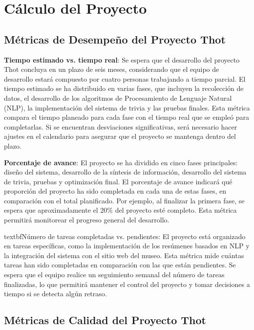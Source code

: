 \documentclass{report}
\begin{document}
    \section{Cálculo del Proyecto}
    \subsection{Métricas de Desempeño del Proyecto Thot}

    \justify
    \textbf{Tiempo estimado vs. tiempo real}: Se espera que el desarrollo del proyecto Thot concluya en un plazo de seis meses, considerando que el equipo de desarrollo estará compuesto por cuatro personas trabajando a tiempo parcial. El tiempo estimado se ha distribuido en varias fases, que incluyen la recolección de datos, el desarrollo de los algoritmos de Procesamiento de Lenguaje Natural (NLP), la implementación del sistema de trivia y las pruebas finales. Esta métrica compara el tiempo planeado para cada fase con el tiempo real que se empleó para completarlas. Si se encuentran desviaciones significativas, será necesario hacer ajustes en el calendario para asegurar que el proyecto se mantenga dentro del plazo.

    \justify
    \textbf{Porcentaje de avance}: El proyecto se ha dividido en cinco fases principales: diseño del sistema, desarrollo de la síntesis de información, desarrollo del sistema de trivia, pruebas y optimización final. El porcentaje de avance indicará qué proporción del proyecto ha sido completada en cada una de estas fases, en comparación con el total planificado. Por ejemplo, al finalizar la primera fase, se espera que aproximadamente el 20\% del proyecto esté completo. Esta métrica permitirá monitorear el progreso general del desarrollo.

    \justify
    textbf{Número de tareas completadas vs. pendientes}: El proyecto está organizado en tareas específicas, como la implementación de los resúmenes basados en NLP y la integración del sistema con el sitio web del museo. Esta métrica mide cuántas tareas han sido completadas en comparación con las que están pendientes. Se espera que el equipo realice un seguimiento semanal del número de tareas finalizadas, lo que permitirá mantener el control del proyecto y tomar decisiones a tiempo si se detecta algún retraso.

    \subsection{Métricas de Calidad del Proyecto Thot}
\end{document}
